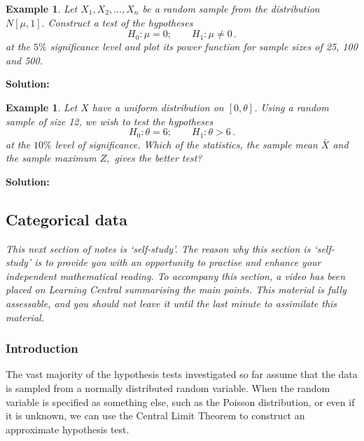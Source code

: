 \documentclass[12pt]{article}
\theoremstyle{break}
\newtheorem{example}[theorem]{Example}
\begin{document}
\begin{example}
Let $X_{1},X_{2},\ldots,X_{n}$ be a random sample from the distribution $N[\mu,1].$ Construct a test of the hypotheses $$
H_{0}: \mu=0; \qquad H_{1}: \mu \neq 0\,.
$$
at the $5\%$ significance level and plot its power function for sample sizes of 25, 100 and 500.
\end{example}

\begin{mdframed}
\bf{Solution:}
\textcolor[rgb]{1.00,1.00,1.00}{\lipsum[1-6]}
\end{mdframed}

\begin{example}
Let $X$ have a uniform distribution on $[0,\theta]$. Using a random sample of size 12, we wish to test the hypotheses
$$
H_{0}: \theta=6; \qquad H_{1}: \theta>6\,.
$$
at the $10\%$ level of significance. Which of the statistics, the sample mean $\bar{X}$ and the sample maximum $Z,$ gives the better test?
\end{example}
\begin{mdframed}
\bf{Solution:}
\textcolor[rgb]{1.00,1.00,1.00}{\lipsum[1-7]}
\end{mdframed}




\subsection{Categorical data}
\begin{mdframed}
{\it This next section of notes is `self-study'. The reason why this section is `self-study' is to provide you with an opportunity to practise and enhance your independent mathematical reading. To accompany this section, a video has been placed on Learning Central summarising the main points. This material is fully assessable, and you should not leave it until the last minute to assimilate this material. }
\end{mdframed}

\subsubsection{Introduction}

The vast majority of the hypothesis tests investigated so far assume that the data is sampled from a normally distributed random variable. When the random variable is specified as something else, such as the Poisson distribution, or even if it is unknown, we can use the Central Limit Theorem to construct an approximate hypothesis test.
\end{document}
